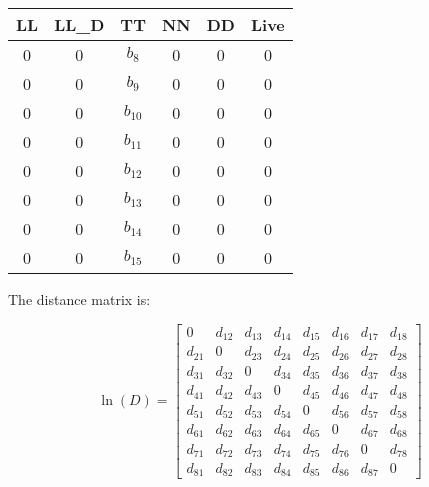 \documentclass[11pt]{article}
\begin{document}
\begin{tiny}
\begin{center}
\begin{tabular}{cccccc}
\hline
LL  & LL\_D  & TT  & NN & DD  & Live \\
\hline
0   & 0     & $b_8$   & 0  & 0   & 0 \\
0   & 0     & $b_9$   & 0  & 0   & 0 \\
0   & 0     & $b_10$   & 0  & 0   & 0 \\
0   & 0     & $b_11$   & 0  & 0   & 0 \\
0   & 0     & $b_12$   & 0  & 0   & 0 \\
0   & 0     & $b_13$   & 0  & 0   & 0 \\
0   & 0     & $b_14$   & 0  & 0   & 0 \\
0   & 0     & $b_15$   & 0  & 0   & 0 \\
\hline
\end{tabular}
\end{center}

The distance matrix is:

\begin{equation*}
\ln(D) =\left[\begin{array}{cccccccc}
0      & d_{12}  & d_{13}  & d_{14}  & d_{15}  & d_{16} & d_{17} & d_{18} \\
d_{21} & 0       & d_{23}  & d_{24}  & d_{25}  & d_{26} & d_{27} & d_{28} \\
d_{31} & d_{32}  & 0       & d_{34}  & d_{35}  & d_{36} & d_{37} & d_{38} \\
d_{41} & d_{42}  & d_{43}  & 0       & d_{45}  & d_{46} & d_{47} & d_{48} \\
d_{51} & d_{52}  & d_{53}  & d_{54}  & 0       & d_{56} & d_{57} & d_{58} \\
d_{61} & d_{62}  & d_{63}  & d_{64}  & d_{65}  & 0      & d_{67} & d_{68} \\
d_{71} & d_{72}  & d_{73}  & d_{74}  & d_{75}  & d_{76} & 0      & d_{78} \\
d_{81} & d_{82}  & d_{83}  & d_{84}  & d_{85}  & d_{86} & d_{87} & 0      \end{array}\right]
\end{equation*}


\end{tiny}
\end{document}

